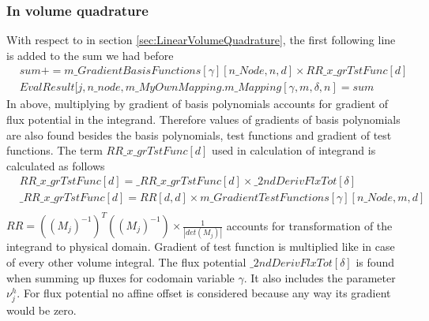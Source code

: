 \documentclass[BoSSSForSolvingConservationLaws.tex]{subfiles}
\begin{document}
\subsubsection*{In volume quadrature}
With respect to  in section \ref{sec:LinearVolumeQuadrature}, the first following line is added to the sum we had before
\begin{align*}
&sum+=m\_GradientBasisFunctions[\gamma][n\_Node, n, d] \times RR\_x\_grTstFunc[d]\\
&EvalResult[j, n\_node, m\_MyOwnMapping.m\_Mapping[\gamma, m, \delta, n]=sum
\end{align*}
In above, multiplying by gradient of basis polynomials accounts for gradient of flux potential in the integrand. Therefore values of gradients of basis polynomials are also found besides the basis polynomials, test functions and gradient of test functions. The term $RR\_x\_grTstFunc[d]$ used in calculation of integrand is calculated as follows
\begin{align*}
&RR\_x\_grTstFunc[d]=\_RR\_x\_grTstFunc[d]\times \_2ndDerivFlxTot[\delta]\\
&\_RR\_x\_grTstFunc[d]=RR[d,d] \times m\_GradientTestFunctions[\gamma][n\_Node, m, d]\\
\end{align*}
$RR=((M_j)^{-1})^T((M_j)^{-1}) \times \frac{1}{|det(M_j)|}$ accounts for transformation of the integrand to physical domain. Gradient of test function is multiplied like in case of every other volume integral. The flux potential $\_2ndDerivFlxTot[\delta]$ is found when summing up fluxes for codomain variable $\gamma$. It also includes the parameter $\nu_j^h$. For flux potential no affine offset is considered because any way its gradient would be zero.\\
\end{document}
